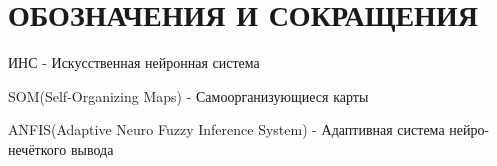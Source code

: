 \section*{ОБОЗНАЧЕНИЯ И СОКРАЩЕНИЯ}

ИНС - Искусственная нейронная система

SOM(Self-Organizing Maps) - Самоорганизующиеся карты

ANFIS(Adaptive Neuro Fuzzy Inference System) - Адаптивная система нейро-нечёткого вывода